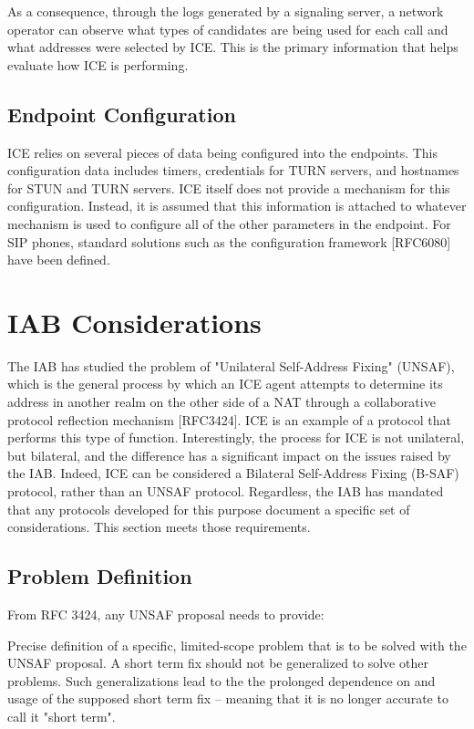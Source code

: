 \documentclass{article}
\begin{document}
As a consequence, through the logs generated by a signaling server, a network operator can observe what types of candidates are being used for each call and what addresses were selected by ICE.  This is the primary information that helps evaluate how ICE is performing.

\subsection{Endpoint Configuration}

ICE relies on several pieces of data being configured into the endpoints.  This configuration data includes timers, credentials for TURN servers, and hostnames for STUN and TURN servers.  ICE itself does not provide a mechanism for this configuration.  Instead, it is assumed that this information is attached to whatever mechanism is used to configure all of the other parameters in the endpoint.  For SIP phones, standard solutions such as the configuration framework [RFC6080] have been defined.

\section{IAB Considerations}

The IAB has studied the problem of "Unilateral Self-Address Fixing" (UNSAF), which is the general process by which an ICE agent attempts to determine its address in another realm on the other side of a NAT through a collaborative protocol reflection mechanism [RFC3424].  ICE is an example of a protocol that performs this type of function. Interestingly, the process for ICE is not unilateral, but bilateral, and the difference has a significant impact on the issues raised by the IAB.  Indeed, ICE can be considered a Bilateral Self-Address Fixing (B-SAF) protocol, rather than an UNSAF protocol.  Regardless, the IAB has mandated that any protocols developed for this purpose document a specific set of considerations.  This section meets those requirements.

\subsection{Problem Definition}

From RFC 3424, any UNSAF proposal needs to provide:

Precise definition of a specific, limited-scope problem that is to be solved with the UNSAF proposal.  A short term fix should not be generalized to solve other problems.  Such generalizations lead to the the prolonged dependence on and usage of the supposed short term fix -- meaning that it is no longer accurate to call it "short term".
\end{document}
